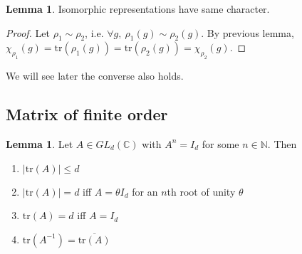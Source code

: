 \documentclass[a4paper]{article}
\newcommand{\tr}{\text{tr}}
\newcommand{\N}{\mathbb{N}}
\newcommand{\C}{\mathbb{C}}
\theoremstyle{definition}
\newtheorem{lemma}[defn]{Lemma}
\begin{document}
\begin{lemma}
\label{lemma:isorepcharsame}
Isomorphic representations have same character.
\end{lemma}
\begin{proof}
Let $\rho_1\sim\rho_2$, i.e. $\forall g,\ \rho_1(g)\sim\rho_2(g)$. By previous lemma, $\chi_{\rho_1}(g)=\tr(\rho_1(g))=\tr(\rho_2(g))=\chi_{\rho_2}(g)$.
\end{proof}
We will see later the converse also holds.

\subsection{Matrix of finite order}
\begin{lemma}
\label{lemma:traceoffinordmat}
Let $A\in GL_d(\C)$ with $A^n=I_d$ for some $n\in\N$. Then
\begin{enumerate}
\item $|\tr(A)|\leq d$
\item $|\tr(A)|=d$ iff $A=\theta I_d$ for an $n$th root of unity $\theta$
\item $\tr(A)=d$ iff $A=I_d$
\item $\tr\left(A^{-1}\right)=\overline{\tr(A)}$
\end{enumerate}
\end{lemma}
\end{document}
